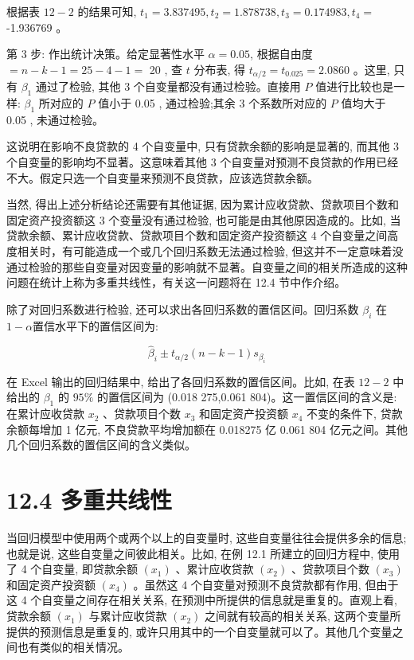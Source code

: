 \documentclass[10pt]{article}
\begin{document}
\begin{CJK*}{UTF8}{bsmi}
根据表 $12-2$ 的结果可知, $t_{1}=3.837495, t_{2}=1.878738, t_{3}=0.174983, t_{4}=$ -1.936769 。

第 3 步: 作出统计决策。给定显著性水平 $\alpha=0.05$, 根据自由度 $=n-k-1=25-4-1=$ 20 , 查 $t$ 分布表, 得 $t_{\alpha / 2}=t_{0.025}=2.0860$ 。这里, 只有 $\beta_{1}$ 通过了检验, 其他 3 个自变量都没有通过检验。直接用 $P$ 值进行比较也是一样: $\beta_{1}$ 所对应的 $P$ 值小于 0.05 , 通过检验;其余 3 个系数所对应的 $P$ 值均大于 0.05 , 未通过检验。

这说明在影响不良贷款的 4 个自变量中, 只有贷款余额的影响是显著的, 而其他 3 个自变量的影响均不显著。这意味着其他 3 个自变量对预测不良贷款的作用已经不大。假定只选一个自变量来预测不良贷款，应该选贷款余额。

当然, 得出上述分析结论还需要有其他证据, 因为累计应收贷款、贷款项目个数和固定资产投资额这 3 个变量没有通过检验, 也可能是由其他原因造成的。比如, 当贷款余额、累计应收贷款、贷款项目个数和固定资产投资额这 4 个自变量之间高度相关时，有可能造成一个或几个回归系数无法通过检验, 但这并不一定意味着没通过检验的那些自变量对因变量的影响就不显著。自变量之间的相关所造成的这种问题在统计上称为多重共线性，有关这一问题将在 12.4 节中作介绍。

除了对回归系数进行检验, 还可以求出各回归系数的置信区间。回归系数 $\beta_{i}$ 在 $1-\alpha$置信水平下的置信区间为:


\begin{equation*}
\hat{\beta}_{i} \pm t_{\alpha / 2}(n-k-1) s_{\beta_{i}} \tag{12.14}
\end{equation*}


在 Excel 输出的回归结果中, 给出了各回归系数的置信区间。比如, 在表 $12-2$ 中给出的 $\beta_{1}$ 的 $95 \%$ 的置信区间为 (0.018 275,0.061 804)。这一置信区间的含义是: 在累计应收贷款 $x_{2}$ 、贷款项目个数 $x_{3}$ 和固定资产投资额 $x_{4}$ 不变的条件下, 贷款余额每增加 1 亿元, 不良贷款平均增加额在 0.018275 亿 0.061 804 亿元之间。其他几个回归系数的置信区间的含义类似。

\section*{12.4 多重共线性}
当回归模型中使用两个或两个以上的自变量时, 这些自变量往往会提供多余的信息;也就是说, 这些自变量之间彼此相关。比如, 在例 12.1 所建立的回归方程中, 使用了 4 个自变量, 即贷款余额 $\left(x_{1}\right)$ 、累计应收贷款 $\left(x_{2}\right)$ 、贷款项目个数 $\left(x_{3}\right)$ 和固定资产投资额 $\left(x_{4}\right)$ 。虽然这 4 个自变量对预测不良贷款都有作用, 但由于这 4 个自变量之间存在相关关系, 在预测中所提供的信息就是重复的。直观上看, 贷款余额 $\left(x_{1}\right)$ 与累计应收贷款 $\left(x_{2}\right)$ 之间就有较高的相关关系, 这两个变量所提供的预测信息是重复的, 或许只用其中的一个自变量就可以了。其他几个变量之间也有类似的相关情况。


\end{CJK*}
\end{document}

